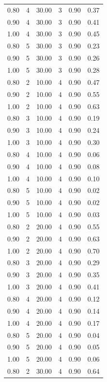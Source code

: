 \documentclass[12pt]{article}
\begin{document}
{\begin{longtable}{cccccc}
  0.80 &   4 & 30.00 &   3 & 0.90 & 0.37 \\ 
  0.90 &   4 & 30.00 &   3 & 0.90 & 0.41 \\ 
  1.00 &   4 & 30.00 &   3 & 0.90 & 0.45 \\ 
  0.80 &   5 & 30.00 &   3 & 0.90 & 0.23 \\ 
  0.90 &   5 & 30.00 &   3 & 0.90 & 0.26 \\ 
  1.00 &   5 & 30.00 &   3 & 0.90 & 0.28 \\ 
  0.80 &   2 & 10.00 &   4 & 0.90 & 0.47 \\ 
  0.90 &   2 & 10.00 &   4 & 0.90 & 0.55 \\ 
  1.00 &   2 & 10.00 &   4 & 0.90 & 0.63 \\ 
  0.80 &   3 & 10.00 &   4 & 0.90 & 0.19 \\ 
  0.90 &   3 & 10.00 &   4 & 0.90 & 0.24 \\ 
  1.00 &   3 & 10.00 &   4 & 0.90 & 0.30 \\ 
  0.80 &   4 & 10.00 &   4 & 0.90 & 0.06 \\ 
  0.90 &   4 & 10.00 &   4 & 0.90 & 0.08 \\ 
  1.00 &   4 & 10.00 &   4 & 0.90 & 0.10 \\ 
  0.80 &   5 & 10.00 &   4 & 0.90 & 0.02 \\ 
  0.90 &   5 & 10.00 &   4 & 0.90 & 0.02 \\ 
  1.00 &   5 & 10.00 &   4 & 0.90 & 0.03 \\ 
  0.80 &   2 & 20.00 &   4 & 0.90 & 0.55 \\ 
  0.90 &   2 & 20.00 &   4 & 0.90 & 0.63 \\ 
  1.00 &   2 & 20.00 &   4 & 0.90 & 0.70 \\ 
  0.80 &   3 & 20.00 &   4 & 0.90 & 0.29 \\ 
  0.90 &   3 & 20.00 &   4 & 0.90 & 0.35 \\ 
  1.00 &   3 & 20.00 &   4 & 0.90 & 0.41 \\ 
  0.80 &   4 & 20.00 &   4 & 0.90 & 0.12 \\ 
  0.90 &   4 & 20.00 &   4 & 0.90 & 0.14 \\ 
  1.00 &   4 & 20.00 &   4 & 0.90 & 0.17 \\ 
  0.80 &   5 & 20.00 &   4 & 0.90 & 0.04 \\ 
  0.90 &   5 & 20.00 &   4 & 0.90 & 0.05 \\ 
  1.00 &   5 & 20.00 &   4 & 0.90 & 0.06 \\ 
  0.80 &   2 & 30.00 &   4 & 0.90 & 0.64 \\ 

\end{longtable}}
\end{document}
